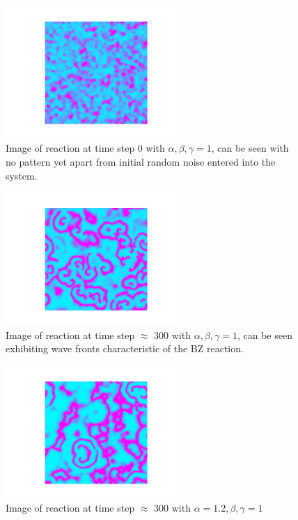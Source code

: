 \documentclass[12pt, A4]{article}
\begin{document}
\begin{figure}[b]
  \begin{center}
    \includegraphics[width=0.6\textwidth]{frame_0.png}
  \end{center}
  \caption{Image of reaction at time step 0 with $\alpha,\beta,\gamma =1$, can be seen with no pattern yet apart from initial random noise entered into the system.}
  \label{fig:frame0}
\end{figure}

\begin{figure}[b]
  \begin{center}
    \includegraphics[width=0.6\textwidth]{frame_300.png}
  \end{center}
  \caption{Image of reaction at time step $\approx$ 300 with $\alpha,\beta,\gamma =1$, can be seen exhibiting wave fronts characteristic of the BZ reaction.}
  \label{fig:frame300}
\end{figure}

\begin{figure}[b]
  \begin{center}
    \includegraphics[width=0.6\textwidth]{frame_300_12.png}
  \end{center}
  \caption{Image of reaction at time step $\approx$ 300 with $\alpha=1.2 ,\beta,\gamma =1$}
  \label{fig:frame300_12}
\end{figure}
\end{document}
